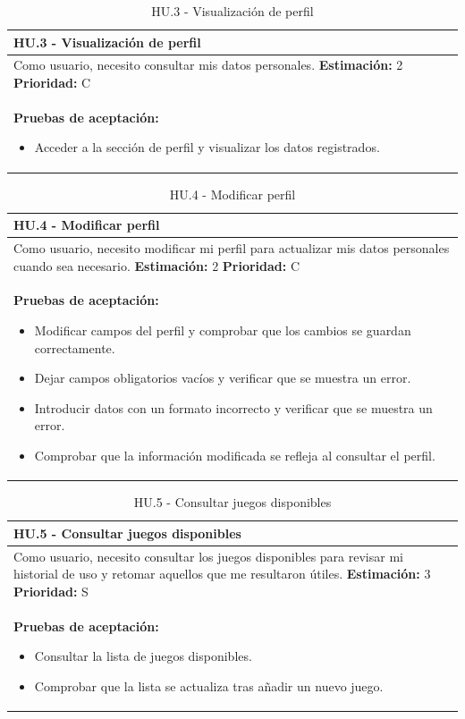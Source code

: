 \begin{table}[H]
\centering
\begin{tabularx}{\textwidth}{|X|}
\hline
\textbf{HU.3 - Visualización de perfil}  \\
\hline
Como usuario, necesito consultar mis datos personales.
\clearpage
\textbf{Estimación: }2
\clearpage
\textbf{Prioridad: }C
\\
\hline
\textbf{Pruebas de aceptación:}
\begin{itemize}
    \item Acceder a la sección de perfil y visualizar los datos registrados.
\end{itemize}
 \\
\hline
\end{tabularx}
\caption{HU.3 - Visualización de perfil}
\end{table}

\begin{table}[H]
\centering
\begin{tabularx}{\textwidth}{|X|}
\hline
\textbf{HU.4 - Modificar perfil}  \\
\hline
Como usuario, necesito modificar mi perfil para actualizar mis datos personales cuando sea necesario. 
\clearpage
\textbf{Estimación: }2
\clearpage
\textbf{Prioridad: }C
\\
\hline
\textbf{Pruebas de aceptación:}
\begin{itemize}
    \item Modificar campos del perfil y comprobar que los cambios se guardan correctamente.
    \item Dejar campos obligatorios vacíos y verificar que se muestra un error.
    \item Introducir datos con un formato incorrecto y verificar que se muestra un error.
    \item Comprobar que la información modificada se refleja al consultar el perfil.
\end{itemize}
\\
\hline
\end{tabularx}
\caption{HU.4 - Modificar perfil}
\end{table}

\begin{table}[H]
\centering
\begin{tabularx}{\textwidth}{|X|}
\hline
\textbf{HU.5 - Consultar juegos disponibles}  \\
\hline
Como usuario, necesito consultar los juegos disponibles para revisar mi historial de uso y retomar aquellos que me resultaron útiles.
\clearpage
\textbf{Estimación: }3
\clearpage
\textbf{Prioridad: }S
\\
\hline
\textbf{Pruebas de aceptación:}
\begin{itemize}
    \item Consultar la lista de juegos disponibles.
    \item Comprobar que la lista se actualiza tras añadir un nuevo juego.
\end{itemize}
\\
\hline
\end{tabularx}
\caption{HU.5 - Consultar juegos disponibles}
\end{table}

